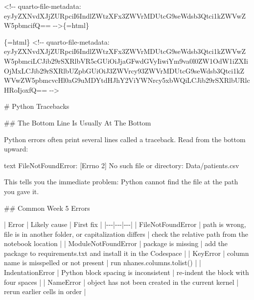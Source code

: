 \documentclass[
  letterpaper,
  DIV=11,
  numbers=noendperiod,
  oneside]{scrreprt}
\newenvironment{Shaded}{\begin{snugshade}}{\end{snugshade}}
\newcommand{\FunctionTok}[1]{\textcolor[rgb]{0.28,0.35,0.67}{#1}}
\newcommand{\InformationTok}[1]{\textcolor[rgb]{0.37,0.37,0.37}{#1}}
\newcommand{\NormalTok}[1]{\textcolor[rgb]{0.00,0.23,0.31}{#1}}
\newcommand{\PreprocessorTok}[1]{\textcolor[rgb]{0.68,0.00,0.00}{#1}}
\begin{document}
\begin{Shaded}
\begin{Highlighting}[numbers=left,,]
\InformationTok{\textasciigrave{}\textless{}!{-}{-} quarto{-}file{-}metadata: eyJyZXNvdXJjZURpciI6IndlZWtzXFx3ZWVrMDUtcG9seWdsb3Qtci1kZWVwZW5pbmcifQ== {-}{-}\textgreater{}\textasciigrave{}}\NormalTok{\{=html\}}

\InformationTok{\textasciigrave{}\textasciigrave{}\textasciigrave{}\{=html\}}
\InformationTok{\textless{}!{-}{-} quarto{-}file{-}metadata: eyJyZXNvdXJjZURpciI6IndlZWtzXFx3ZWVrMDUtcG9seWdsb3Qtci1kZWVwZW5pbmciLCJib29rSXRlbVR5cGUiOiJjaGFwdGVyIiwiYm9va0l0ZW1OdW1iZXIiOjMxLCJib29rSXRlbUZpbGUiOiJ3ZWVrcy93ZWVrMDUtcG9seWdsb3Qtci1kZWVwZW5pbmcvcHl0aG9uMDYtdHJhY2ViYWNrcy5xbWQiLCJib29rSXRlbURlcHRoIjoxfQ== {-}{-}\textgreater{}}
\InformationTok{\textasciigrave{}\textasciigrave{}\textasciigrave{}}

\FunctionTok{\# Python Tracebacks }


\FunctionTok{\#\# The Bottom Line Is Usually At The Bottom}

\NormalTok{Python errors often print several lines called a traceback. Read from the bottom upward:}

\InformationTok{\textasciigrave{}\textasciigrave{}\textasciigrave{}text}
\InformationTok{FileNotFoundError: [Errno 2] No such file or directory: \textquotesingle{}Data/patients.csv\textquotesingle{}}
\InformationTok{\textasciigrave{}\textasciigrave{}\textasciigrave{}}

\NormalTok{This tells you the immediate problem: Python cannot find the file at the path you gave it.}

\FunctionTok{\#\# Common Week 5 Errors}

\PreprocessorTok{|}\NormalTok{ Error }\PreprocessorTok{|}\NormalTok{ Likely cause }\PreprocessorTok{|}\NormalTok{ First fix }\PreprocessorTok{|}
\PreprocessorTok{|{-}{-}{-}|{-}{-}{-}|{-}{-}{-}|}
\PreprocessorTok{|} \InformationTok{\textasciigrave{}FileNotFoundError\textasciigrave{}} \PreprocessorTok{|}\NormalTok{ path is wrong, file is in another folder, or capitalization differs }\PreprocessorTok{|}\NormalTok{ check the relative path from the notebook location }\PreprocessorTok{|}
\PreprocessorTok{|} \InformationTok{\textasciigrave{}ModuleNotFoundError\textasciigrave{}} \PreprocessorTok{|}\NormalTok{ package is missing }\PreprocessorTok{|}\NormalTok{ add the package to }\InformationTok{\textasciigrave{}requirements.txt\textasciigrave{}}\NormalTok{ and install it in the Codespace }\PreprocessorTok{|}
\PreprocessorTok{|} \InformationTok{\textasciigrave{}KeyError\textasciigrave{}} \PreprocessorTok{|}\NormalTok{ column name is misspelled or not present }\PreprocessorTok{|}\NormalTok{ run }\InformationTok{\textasciigrave{}nhanes.columns.tolist()\textasciigrave{}} \PreprocessorTok{|}
\PreprocessorTok{|} \InformationTok{\textasciigrave{}IndentationError\textasciigrave{}} \PreprocessorTok{|}\NormalTok{ Python block spacing is inconsistent }\PreprocessorTok{|}\NormalTok{ re{-}indent the block with four spaces }\PreprocessorTok{|}
\PreprocessorTok{|} \InformationTok{\textasciigrave{}NameError\textasciigrave{}} \PreprocessorTok{|}\NormalTok{ object has not been created in the current kernel }\PreprocessorTok{|}\NormalTok{ rerun earlier cells in order }\PreprocessorTok{|}


\end{Highlighting}
\end{Shaded}
\end{document}
